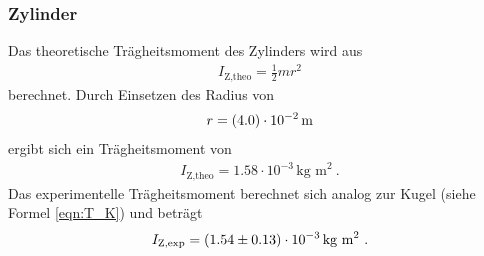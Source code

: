 \subsubsection{Zylinder}
Das theoretische Trägheitsmoment des Zylinders wird aus
\begin{align}
	I_\text{Z,theo} = \frac{1}{2} mr^2
\end{align}
berechnet. Durch Einsetzen des Radius von
\begin{align*}
	r = (\num{4.0 +- 0.0}) \cdot 10^{-2} \, \text{m}
\end{align*}
ergibt sich ein Trägheitsmoment von
\begin{align}
	I_\text{Z,theo} = 1.58 \cdot 10^{-3} \, \text{kg m}^2 \ .
\end{align}
Das experimentelle Trägheitsmoment berechnet sich analog zur Kugel (siehe Formel \ref{eqn:T_K}) und beträgt
\begin{align}
	I_\text{Z,exp} = (\num{1.54 +- 0.13}) \cdot 10^{-3} \, \text{kg m}^2 \ .
\end{align}

